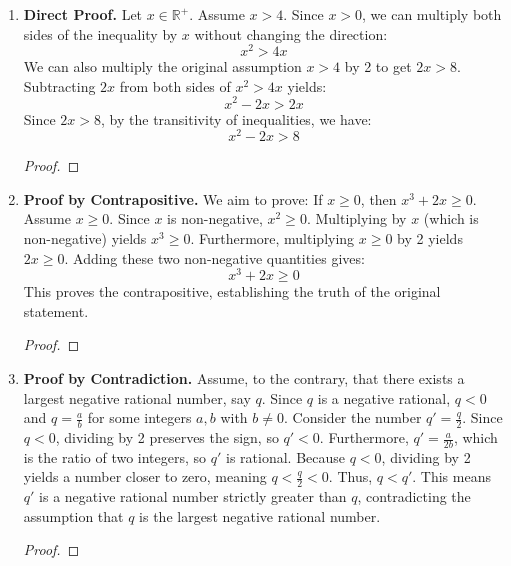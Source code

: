 \documentclass[11pt]{article}
\renewcommand{\qedsymbol}{$\blacksquare$}
\begin{document}
\begin{enumerate}
    \item \textbf{Direct Proof.} Let $x \in \mathbb{R}^+$. Assume $x > 4$. Since $x > 0$, we can multiply both sides of the inequality by $x$ without changing the direction:
    \[ x^2 > 4x \]
    We can also multiply the original assumption $x > 4$ by 2 to get $2x > 8$. Subtracting $2x$ from both sides of $x^2 > 4x$ yields:
    \[ x^2 - 2x > 2x \]
    Since $2x > 8$, by the transitivity of inequalities, we have:
    \[ x^2 - 2x > 8 \]
    \begin{proof}\renewcommand{\qedsymbol}{$\blacksquare$}\end{proof}

    \item \textbf{Proof by Contrapositive.} We aim to prove: If $x \ge 0$, then $x^3 + 2x \ge 0$. Assume $x \ge 0$. Since $x$ is non-negative, $x^2 \ge 0$. Multiplying by $x$ (which is non-negative) yields $x^3 \ge 0$. Furthermore, multiplying $x \ge 0$ by 2 yields $2x \ge 0$. Adding these two non-negative quantities gives:
    \[ x^3 + 2x \ge 0 \]
    This proves the contrapositive, establishing the truth of the original statement.
    \begin{proof}\renewcommand{\qedsymbol}{$\blacksquare$}\end{proof}

    \item \textbf{Proof by Contradiction.} Assume, to the contrary, that there exists a largest negative rational number, say $q$. Since $q$ is a negative rational, $q < 0$ and $q = \frac{a}{b}$ for some integers $a, b$ with $b \neq 0$. Consider the number $q' = \frac{q}{2}$. Since $q < 0$, dividing by 2 preserves the sign, so $q' < 0$. Furthermore, $q' = \frac{a}{2b}$, which is the ratio of two integers, so $q'$ is rational. Because $q < 0$, dividing by 2 yields a number closer to zero, meaning $q < \frac{q}{2} < 0$. Thus, $q < q'$. This means $q'$ is a negative rational number strictly greater than $q$, contradicting the assumption that $q$ is the largest negative rational number.
    \begin{proof}\renewcommand{\qedsymbol}{$\blacksquare$}\end{proof}


\end{enumerate}
\end{document}
